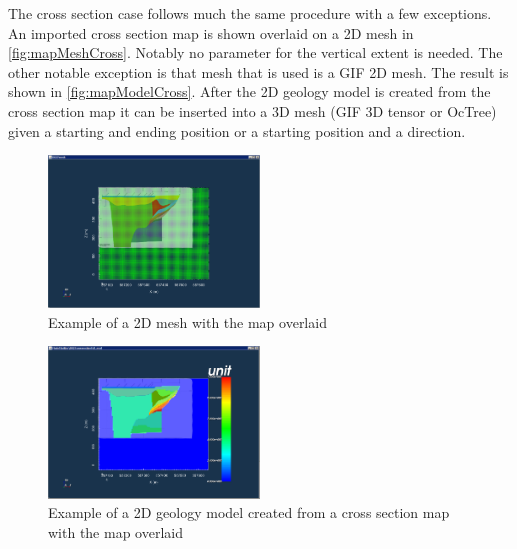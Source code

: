 The cross section case follows much the same procedure with a few exceptions. An imported cross section map is shown overlaid on a 2D mesh in \autoref{fig:mapMeshCross}. Notably no parameter for the vertical extent is needed. The other notable exception is that mesh that is used is a \ac{GIF} 2D mesh. The result is shown in \autoref{fig:mapModelCross}.  After the 2D geology model is created from the cross section map it can be inserted into a 3D mesh (\ac{GIF} 3D tensor or OcTree) given a starting and ending position or a starting position and a direction.

\begin{figure} [h]
    \centering
    \includegraphics[width=0.5\textwidth]{images/GUI/mapMeshCross.PNG}
    \caption{Example of a 2D mesh with the map overlaid}
    \label{fig:mapMeshCross}
\end{figure}

\begin{figure} [h]
    \centering
    \includegraphics[width=0.5\textwidth]{images/GUI/mapModelCross.PNG}
    \caption{Example of a 2D geology model created from a cross section map with the map overlaid}
    \label{fig:mapModelCross}
\end{figure}






%

\endinput

 Interestingly, the assumption that all magnetizations are in the same direction also assumes that all Koenigsberger ratios are equal.

Any text after an \endinput is ignored.
You could put scraps here or things in progress.
